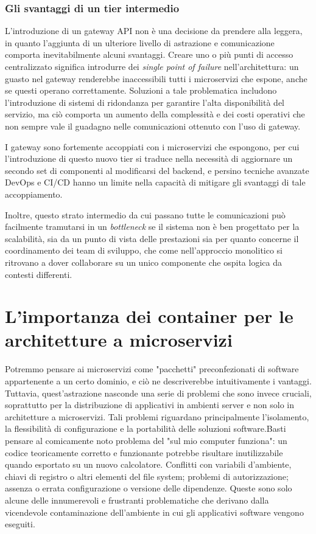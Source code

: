 \subsubsection{Gli svantaggi di un tier intermedio}
L'introduzione di un gateway API non è una decisione da prendere alla leggera, in quanto l'aggiunta di un ulteriore livello di astrazione e comunicazione comporta inevitabilmente alcuni svantaggi.
Creare uno o più punti di accesso centralizzato significa introdurre dei \emph{single point of failure} nell'architettura: un guasto nel gateway renderebbe inaccessibili tutti i microservizi che espone, anche se questi operano correttamente. Soluzioni a tale problematica includono l'introduzione di sistemi di ridondanza per garantire l'alta disponibilità del servizio, ma ciò comporta un aumento della complessità e dei costi operativi che non sempre vale il guadagno nelle comunicazioni ottenuto con l'uso di gateway.

I gateway sono fortemente accoppiati con i microservizi che espongono, per cui l'introduzione di questo nuovo tier si traduce nella necessità di aggiornare un secondo set di componenti al modificarsi del backend, e persino tecniche avanzate DevOps e CI/CD hanno un limite nella capacità di mitigare gli svantaggi di tale accoppiamento.

Inoltre, questo strato intermedio da cui passano tutte le comunicazioni può facilmente tramutarsi in un \emph{bottleneck} se il sistema non è ben progettato per la scalabilità, sia da un punto di vista delle prestazioni sia per quanto concerne il coordinamento dei team di sviluppo, che come nell'approccio monolitico si ritrovano a dover collaborare su un unico componente che ospita logica da contesti differenti.\cite[47-48]{.NET_Microservices}


\section{L'importanza dei container per le architetture a microservizi}
Potremmo pensare ai microservizi come "pacchetti" preconfezionati di software appartenente a un certo dominio, e ciò ne descriverebbe intuitivamente i vantaggi. Tuttavia, quest'astrazione nasconde una serie di problemi che sono invece cruciali, soprattutto per la distribuzione di applicativi in ambienti server e non solo in architetture a microservizi.
Tali problemi riguardano principalmente l'isolamento, la flessibilità di configurazione e la portabilità delle soluzioni software.Basti pensare al comicamente noto problema del "sul mio computer funziona": un codice teoricamente corretto e funzionante potrebbe risultare inutilizzabile quando esportato su un nuovo calcolatore.
Conflitti con variabili d'ambiente, chiavi di registro o altri elementi del file system; problemi di autorizzazione; assenza o errata configurazione o versione delle dipendenze. Queste sono solo alcune delle innumerevoli e frustranti problematiche che derivano dalla vicendevole contaminazione dell'ambiente in cui gli applicativi software vengono eseguiti.

